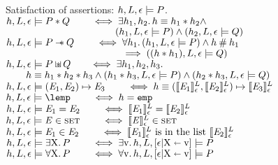 \documentclass{article}
\begin{document}
%
\begin{display}{Satisfaction of assertions: $h,L,{\epsilon} \models P$.}
${h,L,{\epsilon} \models P \mathbin{*} Q \qquad\iff \exists h_1,h_2 \mathpunct{.}  h \equiv h_1 \mathbin{*} h_2 \land }$\\
${\phantom{h,L,{\env} \satisfies P \sep Q \qquad\iff}(h_1,L,{\env} \satisfies P) \land (h_2,L,{\env} \satisfies Q)}$\\
%
${h,L,{\epsilon} \models P \mathbin{-\mkern-6mu *} Q\qquad\iff \forall h_1 \mathpunct{.} (h_1,L,{\epsilon} \models P) \land h\mathbin{\#}h_1}$\\
${\phantom{h,L,{\env} \satisfies P \wand Q\qquad\iff }\implies ((h \sep h_1),L,{\env} \satisfies Q)}$\\
%
${h,L,{\epsilon} \models P \mathbin{\sqcup\mkern-10mu*} Q}{\qquad\iff \exists h_1,h_2,h_3\mathpunct{.}}$\\
$\qquad  h \equiv h_1 \mathbin{*} h_2 \mathbin{*} h_3 \land 
   (h_1\mathbin{*} h_3,L,{\epsilon} \models P) \land    (h_2\mathbin{*} h_3,L,{\epsilon} \models Q)$\\
%
$ h,L,{\epsilon} \models ({{\mathit{E}}_1},{{\mathit{E}}_2})\mapsto {{\ensuremath{\mathit{E}}}_3} \qquad\iff h \equiv (\llbracket {{\ensuremath{\mathit{E}}}_1} \rrbracket^L_{\epsilon},\llbracket {{\ensuremath{\mathit{E}}}_2} \rrbracket^L_{\epsilon})\mapsto \llbracket {{\ensuremath{\mathit{E}}}_3} \rrbracket^L_{\epsilon}$\\
$  h,L,\env \satisfies \lemp  \qquad\iff h = \emp $\\
$ h,L,{\epsilon} \models {{\ensuremath{\mathit{E}}}_1} = {{\mathit{E}}_2} \qquad\iff \llbracket {{\ensuremath{\mathit{E}}}_1} \rrbracket^L_{\epsilon} = \llbracket {{\ensuremath{\mathit{E}}}_2} \rrbracket^L_{\epsilon} $\\
$  h,L,{\epsilon} \models {\ensuremath{\mathit{E}}} \in {\mbox{\textsc{set}}}  \qquad\iff \llbracket {\ensuremath{\mathit{E}}} \rrbracket^L_{\epsilon} \in {\mbox{\textsc{set}}} $\\
$  h,L,{\epsilon} \models {\ensuremath{\mathit{E}}}_1 \in {\ensuremath{\mathit{E}}}_2  \qquad\iff \llbracket {\ensuremath{\mathit{E}}}_1 \rrbracket^L_{\epsilon} \text{ is in the list } \llbracket {\ensuremath{\mathit{E}}}_2 \rrbracket^L_{\epsilon} $\\

$  h,L,{\epsilon} \models \exists{\ensuremath{\mathrm{X}}} \mathpunct{.} P  \qquad\iff \exists {\ensuremath{\mathrm{v}}} \mathpunct{.} h,L,[{\epsilon} | {\mathrm{X}}\shortleftarrow {\ensuremath{\mathrm{v}}}] \models P $\\
 $ h,L,{\epsilon} \models \forall{\ensuremath{\mathrm{X}}} \mathpunct{.} P  \qquad\iff \forall {\ensuremath{\mathrm{v}}} \mathpunct{.} h,L,[{\epsilon} | {\mathrm{X}}\shortleftarrow {\ensuremath{\mathrm{v}}}] \models P $
\end{display}
\end{document}
